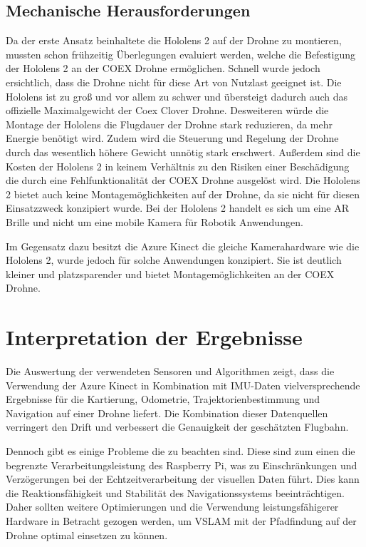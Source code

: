 \subsection{Mechanische Herausforderungen}\label{mechanische-herausforderungen:section}

Da der erste Ansatz beinhaltete die Hololens 2 auf der Drohne zu montieren, mussten schon frühzeitig Überlegungen evaluiert werden, welche die Befestigung der Hololens 2 an der COEX Drohne ermöglichen. Schnell wurde jedoch ersichtlich, dass die Drohne nicht für diese Art von Nutzlast geeignet ist. Die Hololens ist zu groß und vor allem zu schwer und übersteigt dadurch auch das offizielle Maximalgewicht der Coex Clover Drohne. Desweiteren würde die Montage der Hololens die Flugdauer der Drohne stark reduzieren, da mehr Energie benötigt wird. Zudem wird die Steuerung und Regelung der Drohne durch das wesentlich höhere Gewicht unnötig stark erschwert. Außerdem sind die Kosten der Hololens 2 in keinem Verhältnis zu den Risiken einer Beschädigung die durch eine Fehlfunktionalität der COEX Drohne ausgelöst wird. Die Hololens 2 bietet auch keine Montagemöglichkeiten auf der Drohne, da sie nicht für diesen Einsatzzweck konzipiert wurde. Bei der Hololens 2 handelt es sich um eine \ac{AR} Brille und nicht um eine mobile Kamera für Robotik Anwendungen.

Im Gegensatz dazu besitzt die Azure Kinect die gleiche Kamerahardware wie die Hololens 2, wurde jedoch für solche Anwendungen konzipiert. Sie ist deutlich kleiner und platzsparender und bietet Montagemöglichkeiten an der COEX Drohne. 

\section{Interpretation der Ergebnisse}

Die Auswertung der verwendeten Sensoren und Algorithmen zeigt, dass die Verwendung der Azure Kinect in Kombination mit \ac{IMU}-Daten vielversprechende Ergebnisse für die Kartierung, Odometrie, Trajektorienbestimmung und Navigation auf einer Drohne liefert. Die Kombination dieser Datenquellen verringert den Drift und verbessert die Genauigkeit der geschätzten Flugbahn.

Dennoch gibt es einige Probleme die zu beachten sind. Diese sind zum einen die begrenzte Verarbeitungsleistung des Raspberry Pi, was zu Einschränkungen und Verzögerungen bei der Echtzeitverarbeitung der visuellen Daten führt. Dies kann die Reaktionsfähigkeit und Stabilität des Navigationssystems beeinträchtigen. Daher sollten weitere Optimierungen und die Verwendung leistungsfähigerer Hardware in Betracht gezogen werden, um \ac{VSLAM} mit der Pfadfindung auf der Drohne optimal einsetzen zu können.

